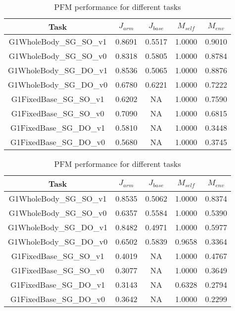 \begin{table}[ht]
\centering
\captionsetup{width=0.8\linewidth}
\caption{Performance metrics for different tasks across SSA, PFM, CBF, SMA, and SSS}
\label{tb:task_scores}

\begin{subtable}[ht]{\textwidth}
    \centering
    \caption{SSA performance for different tasks}
    \label{tb:ssa_task_scores}
    \begin{tabular}{c|cccc}
    \toprule
    \textbf{Task} & $J_{arm}$ & $J_{base}$ & $M_{self}$ & $M_{env}$ \\
    \midrule
    G1WholeBody\_SG\_SO\_v1 & 0.8691 & 0.5517 & 1.0000 & 0.9010 \\
    G1WholeBody\_SG\_SO\_v0 & 0.8318 & 0.5805 & 1.0000 & 0.8784 \\
    G1WholeBody\_SG\_DO\_v1 & 0.8536 & 0.5065 & 1.0000 & 0.8876 \\
    G1WholeBody\_SG\_DO\_v0 & 0.6780 & 0.6221 & 1.0000 & 0.7222 \\
    \midrule
    G1FixedBase\_SG\_SO\_v1 & 0.6202 & NA & 1.0000 & 0.7590 \\
    G1FixedBase\_SG\_SO\_v0 & 0.7090 & NA & 1.0000 & 0.6815 \\
    G1FixedBase\_SG\_DO\_v1 & 0.5810 & NA & 1.0000 & 0.3448 \\
    G1FixedBase\_SG\_DO\_v0 & 0.5680 & NA & 1.0000 & 0.3745 \\
    \bottomrule
    \end{tabular}
\end{subtable}


\vspace{0.5cm}

\begin{subtable}[ht]{\textwidth}
    \centering
    \caption{PFM performance for different tasks}
    \label{tb:pfm_task_scores}
    \begin{tabular}{c|cccc}
    \toprule
    \textbf{Task} & $J_{arm}$ & $J_{base}$ & $M_{self}$ & $M_{env}$ \\
    \midrule
    G1WholeBody\_SG\_SO\_v1 & 0.8535 & 0.5062 & 1.0000 & 0.8374 \\
    G1WholeBody\_SG\_SO\_v0 & 0.6357 & 0.5584 & 1.0000 & 0.5390 \\
    G1WholeBody\_SG\_DO\_v1 & 0.8482 & 0.4971 & 1.0000 & 0.5977 \\
    G1WholeBody\_SG\_DO\_v0 & 0.6502 & 0.5839 & 0.9658 & 0.3364 \\
    \midrule
    G1FixedBase\_SG\_SO\_v1 & 0.4019 & NA & 1.0000 & 0.4767 \\
    G1FixedBase\_SG\_SO\_v0 & 0.3077 & NA & 1.0000 & 0.3649 \\
    G1FixedBase\_SG\_DO\_v1 & 0.3143 & NA & 0.6328 & 0.2794 \\
    G1FixedBase\_SG\_DO\_v0 & 0.3642 & NA & 1.0000 & 0.2299 \\
    \bottomrule
    \end{tabular}
\end{subtable}



\end{table}
